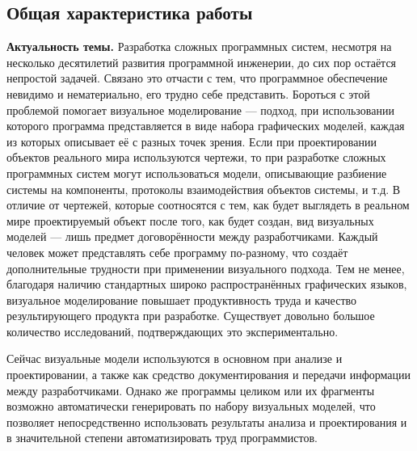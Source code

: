 \subsection*{\Large Общая характеристика работы}
\fontsize{14pt}{15pt}\selectfont
\textbf{Актуальность темы.}
Разработка сложных программных систем, несмотря на несколько десятилетий 
развития программной инженерии, до сих пор остаётся непростой задачей. 
Связано это отчасти с тем, что программное обеспечение невидимо и нематериально, 
его трудно себе представить. Бороться с этой проблемой помогает визуальное 
моделирование --- подход, при использовании которого программа представляется в 
виде набора графических моделей, каждая из которых описывает её с разных точек 
зрения. Если при проектировании объектов реального мира используются чертежи, то при 
разработке сложных программных систем могут использоваться модели, описывающие разбиение системы на компоненты, 
протоколы взаимодействия объектов системы, и т.д. В отличие от чертежей, которые 
соотносятся с тем, как будет выглядеть в реальном мире проектируемый объект 
после того, как будет создан, вид визуальных моделей --- лишь предмет 
договорённости между разработчиками. Каждый человек может представлять себе 
программу по-разному, что создаёт дополнительные трудности при применении 
визуального подхода. Тем не менее, благодаря наличию стандартных широко 
распространённых графических языков, визуальное моделирование повышает 
продуктивность труда и качество результирующего продукта при разработке. 
Существует довольно большое количество исследований, подтверждающих это экспериментально.

Сейчас визуальные модели используются в основном при анализе и проектировании, 
а также как средство документирования и передачи информации между 
разработчиками. Однако же программы целиком или их фрагменты возможно 
автоматически генерировать по набору визуальных моделей, что позволяет 
непосредственно использовать результаты анализа и проектирования и в 
значительной степени автоматизировать труд программистов. 

